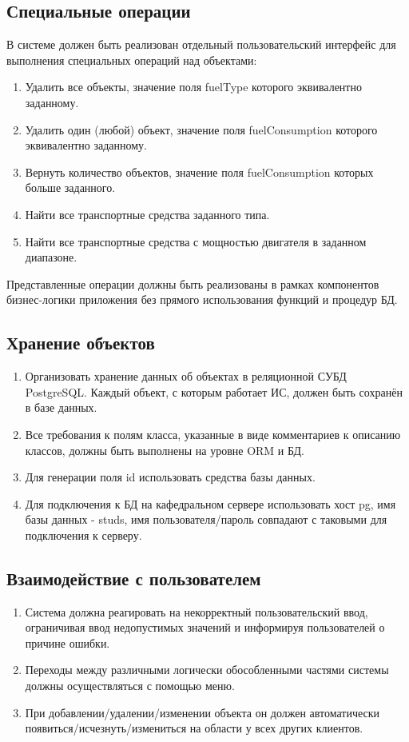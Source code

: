 \documentclass[14pt,a4paper]{extarticle}
\begin{document}
\subsection*{Специальные операции}
В системе должен быть реализован отдельный пользовательский интерфейс для выполнения специальных операций над объектами:
\begin{enumerate}
\item Удалить все объекты, значение поля fuelType которого эквивалентно заданному.
\item Удалить один (любой) объект, значение поля fuelConsumption которого эквивалентно заданному.
\item Вернуть количество объектов, значение поля fuelConsumption которых больше заданного.
\item Найти все транспортные средства заданного типа.
\item Найти все транспортные средства с мощностью двигателя в заданном диапазоне.
\end{enumerate}
Представленные операции должны быть реализованы в рамках компонентов бизнес-логики приложения без прямого использования функций и процедур БД.

\subsection*{Хранение объектов}
\begin{enumerate}
\item Организовать хранение данных об объектах в реляционной СУБД PostgreSQL. Каждый объект, с которым работает ИС, должен быть сохранён в базе данных.
\item Все требования к полям класса, указанные в виде комментариев к описанию классов, должны быть выполнены на уровне ORM и БД.
\item Для генерации поля id использовать средства базы данных.
\item Для подключения к БД на кафедральном сервере использовать хост pg, имя базы данных - studs, имя пользователя/пароль совпадают с таковыми для подключения к серверу.
\end{enumerate}

\subsection*{Взаимодействие с пользователем}
\begin{enumerate}
\item Система должна реагировать на некорректный пользовательский ввод, ограничивая ввод недопустимых значений и информируя пользователей о причине ошибки.
\item Переходы между различными логически обособленными частями системы должны осуществляться с помощью меню.
\item При добавлении/удалении/изменении объекта он должен автоматически появиться/исчезнуть/измениться на области у всех других клиентов.
\end{enumerate}
\end{document}
